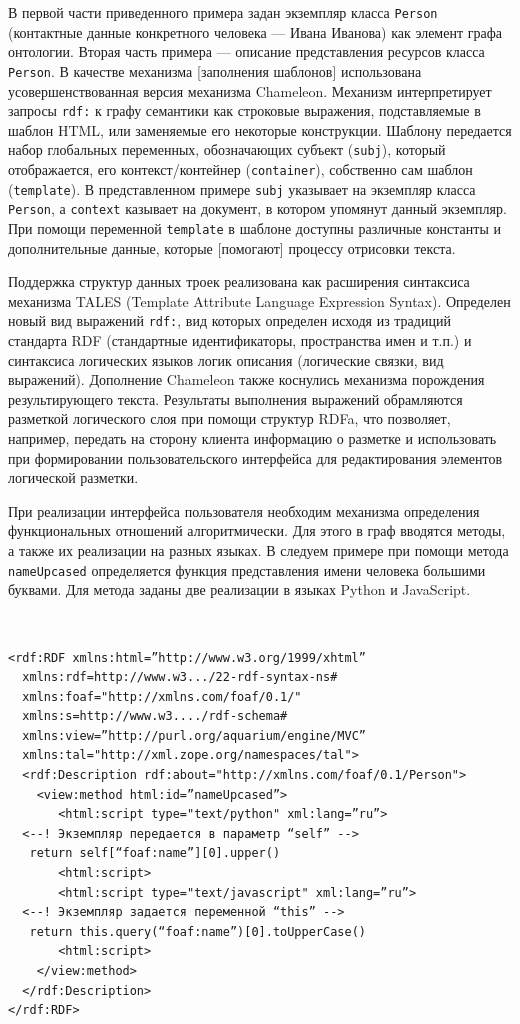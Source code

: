 \documentclass[utf8]{../IncArticle}
\newcommand{\e}[2][fcolor]{\textcolor{pcolor}{[}\textcolor{#1}{#2}\textcolor{pcolor}{]}}
\begin{document}
В первой части приведенного примера задан экземпляр класса
\texttt{Person} (контактные данные конкретного человека --- Ивана
Иванова) как элемент графа онтологии.  Вторая часть примера ---
описание представления ресурсов класса \texttt{Person}.  В качестве
механизма \e{заполнения шаблонов} использована усовершенствованная
версия механизма Chameleon.  Механизм интерпретирует запросы
\texttt{rdf:} к графу семантики как строковые выражения, подставляемые
в шаблон HTML, или заменяемые его некоторые конструкции.  Шаблону
передается набор глобальных переменных, обозначающих субъект
(\texttt{subj}), который отображается, его контекст/контейнер
(\texttt{container}), собственно сам шаблон (\texttt{template}).  В
представленном примере \texttt{subj} указывает на экземпляр класса
\texttt{Person}, а \texttt{context} казывает на документ, в котором
упомянут данный экземпляр.  При помощи переменной \texttt{template} в
шаблоне доступны различные константы и дополнительные данные, которые
\e{помогают} процессу отрисовки текста.

Поддержка структур данных троек реализована как расширения синтаксиса
механизма TALES (Template Attribute Language Expression
Syntax). Определен новый вид выражений \texttt{rdf:}, вид которых
определен исходя из традиций стандарта RDF (стандартные
идентификаторы, пространства имен и т.п.) и синтаксиса логических
языков логик описания (логические связки, вид выражений).  Дополнение
Chameleon также коснулись механизма порождения результирующего
текста. Результаты выполнения выражений обрамляются разметкой
логического слоя при помощи структур RDFa, что позволяет, например,
передать на сторону клиента информацию о разметке и использовать при
формировании пользовательского интерфейса для редактирования элементов
логической разметки.

При реализации интерфейса пользователя необходим механизма определения
функциональных отношений алгоритмически.  Для этого в граф вводятся
методы, а также их реализации на разных языках.  В следуем примере при
помощи метода \texttt{nameUpcased} определяется функция представления
имени человека большими буквами.  Для метода заданы две реализации в
языках Python и JavaScript.

\begingroup
\tt
\begin{verbatim}
<rdf:RDF xmlns:html=”http://www.w3.org/1999/xhtml”
  xmlns:rdf=http://www.w3.../22-rdf-syntax-ns#
  xmlns:foaf="http://xmlns.com/foaf/0.1/"
  xmlns:s=http://www.w3..../rdf-schema#
  xmlns:view=”http://purl.org/aquarium/engine/MVC”
  xmlns:tal="http://xml.zope.org/namespaces/tal">
  <rdf:Description rdf:about="http://xmlns.com/foaf/0.1/Person">
    <view:method html:id=”nameUpcased”>
       <html:script type="text/python" xml:lang=”ru”>
  <--! Экземпляр передается в параметр “self” -->
   return self[“foaf:name”][0].upper()
       <html:script>
       <html:script type="text/javascript" xml:lang=”ru”>
  <--! Экземпляр задается переменной “this” -->
   return this.query(“foaf:name”)[0].toUpperCase()
       <html:script>
    </view:method>
  </rdf:Description>
</rdf:RDF>
\end{verbatim}
\endgroup
\end{document}
